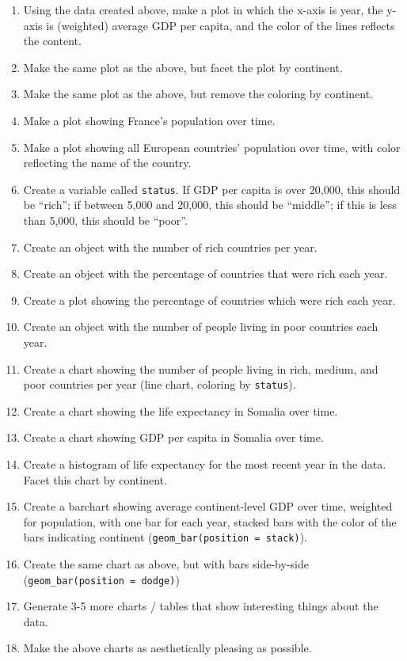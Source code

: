 \documentclass[
]{book}
\begin{document}
\begin{enumerate}
\item
  Using the data created above, make a plot in which the x-axis is year, the y-axis is (weighted) average GDP per capita, and the color of the lines reflects the content.
\item
  Make the same plot as the above, but facet the plot by continent.
\item
  Make the same plot as the above, but remove the coloring by continent.
\item
  Make a plot showing France's population over time.
\item
  Make a plot showing all European countries' population over time, with color reflecting the name of the country.
\item
  Create a variable called \texttt{status}. If GDP per capita is over 20,000, this should be ``rich''; if between 5,000 and 20,000, this should be ``middle''; if this is less than 5,000, this should be ``poor''.
\item
  Create an object with the number of rich countries per year.
\item
  Create an object with the percentage of countries that were rich each year.
\item
  Create a plot showing the percentage of countries which were rich each year.
\item
  Create an object with the number of people living in poor countries each year.
\item
  Create a chart showing the number of people living in rich, medium, and poor countries per year (line chart, coloring by \texttt{status}).
\item
  Create a chart showing the life expectancy in Somalia over time.
\item
  Create a chart showing GDP per capita in Somalia over time.
\item
  Create a histogram of life expectancy for the most recent year in the data. Facet this chart by continent.
\item
  Create a barchart showing average continent-level GDP over time, weighted for population, with one bar for each year, stacked bars with the color of the bars indicating continent (\texttt{geom\_bar(position\ =\ \textquotesingle{}stack\textquotesingle{})}).
\item
  Create the same chart as above, but with bars side-by-side (\texttt{geom\_bar(position\ =\ \textquotesingle{}dodge\textquotesingle{})})
\item
  Generate 3-5 more charts / tables that show interesting things about the data.
\item
  Make the above charts as aesthetically pleasing as possible.
\end{enumerate}
\end{document}
